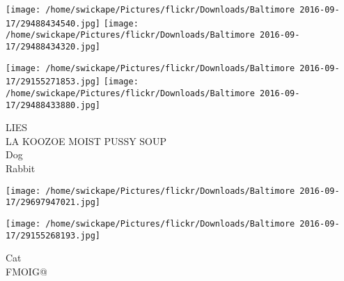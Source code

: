 \documentclass[10pt,letterpaper]{article}
\begin{document}
\texttt{[image: /home/swickape/Pictures/flickr/Downloads/Baltimore 2016-09-17/29488434540.jpg]}
\texttt{[image: /home/swickape/Pictures/flickr/Downloads/Baltimore 2016-09-17/29488434320.jpg]}

\texttt{[image: /home/swickape/Pictures/flickr/Downloads/Baltimore 2016-09-17/29155271853.jpg]}
\texttt{[image: /home/swickape/Pictures/flickr/Downloads/Baltimore 2016-09-17/29488433880.jpg]}

LIES\\
LA KOOZOE MOIST PUSSY SOUP\\
Dog\\
Rabbit\\
\pagebreak

\texttt{[image: /home/swickape/Pictures/flickr/Downloads/Baltimore 2016-09-17/29697947021.jpg]}

\vspace{0.25in}
\texttt{[image: /home/swickape/Pictures/flickr/Downloads/Baltimore 2016-09-17/29155268193.jpg]}

Cat\\
FMOIG@\\
\pagebreak
\end{document}
